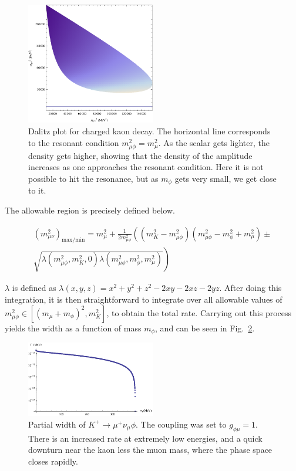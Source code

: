 \begin{figure}[h]
    \centering
    \includegraphics[width=0.5\textwidth]{Figures/kaon/dalitz}
    \caption{Dalitz plot for charged kaon decay. The horizontal line corresponds to the resonant condition $m_{\mu\phi}^2 = m_\mu^2$. As the scalar  gets lighter, the density gets higher, showing that the density of the amplitude increases as one approaches the resonant condition. Here it is not possible to hit the resonance, but as $m_\phi$ gets very small, we get close to it.}
    \label{fig:dalitz_plot}
\end{figure}

\noindent The allowable region is precisely defined below.

\begin{equation}
\begin{split}
    (m_{\mu\nu}^2)_\textrm{max/min} = m_\mu^2 + \frac{1}{2 m_{\mu\phi}^2} \left(\left(m_K^2 - m_{\mu\phi}^2\right)\left(m_{\mu\phi}^2 - m_\phi^2 + m_\mu^2\right) \pm \right. \\
    \left. \sqrt{\lambda\left(m_{\mu\phi}^2,m_K^2,0\right) \lambda\left(m_{\mu\phi}^2,m_\phi^2,m_\mu^2\right)}\right)
\end{split}
\end{equation}

\noindent $\lambda$ is defined as $\lambda(x,y,z) = x^2 + y^2 + z^2 - 2xy -2xz - 2yz$.
After doing this integration, it is then straightforward to integrate over all allowable values of $m_{\mu\phi}^2 \in [(m_\mu + m_\phi)^2, m_K^2]$, to obtain the total rate.
Carrying out this process yields the width as a function of mass $m_\phi$, and can be seen in Fig.~\ref{fig:kaon_width}.

\begin{figure}[h]
    \centering
    \includegraphics[width=0.5\textwidth]{Figures/kaon/kaon_width}
    \caption{Partial width of $K^+ \rightarrow \mu^+ \nu_\mu \phi$. The coupling was set to $g_{\phi\mu}=1$. There is an increased rate at extremely low energies, and a quick downturn near the kaon less the muon mass, where the phase space closes rapidly.}
    \label{fig:kaon_width}
\end{figure}

